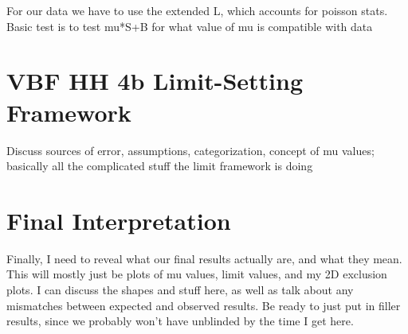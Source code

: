     For our data we have to use the extended L, which accounts for poisson stats.
    Basic test is to test mu*S+B for what value of mu is compatible with data

        


\section{VBF \to HH \to 4b Limit-Setting Framework}

    Discuss sources of error, assumptions, categorization, concept of mu values;
    basically all the complicated stuff the limit framework is doing

\section{Final Interpretation}

    Finally, I need to reveal what our final results actually are, and what they mean.
    This will mostly just be plots of mu values, limit values, and my 2D exclusion plots.
    I can discuss the shapes and stuff here, as well as talk about any mismatches between expected and observed results.
    Be ready to just put in filler results, since we probably won't have unblinded by the time I get here.


